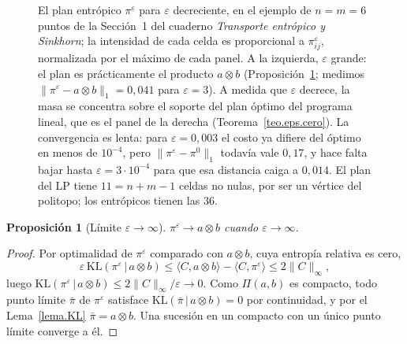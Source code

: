 \documentclass[12pt, a4paper]{amsbook}
\newcommand{\ve}{\varepsilon}
\newtheorem{prop}[teo]{Proposición}
\theoremstyle{remark}
\theoremstyle{definition}
\numberwithin{section}{chapter}
\numberwithin{subsection}{section}
\numberwithin{equation}{section}
\numberwithin{figure}{chapter}
\begin{document}
\begin{figure}[ht]
\caption{El plan entrópico $\pi^\ve$ para $\ve$ decreciente, en el ejemplo de
$n=m=6$ puntos de la Sección~1 del cuaderno \emph{Transporte entrópico y
Sinkhorn}; la intensidad de cada celda es proporcional a $\pi^\ve_{ij}$,
normalizada por el máximo de cada panel. A la izquierda, $\ve$ grande: el plan
es prácticamente el producto $a\otimes b$
(Proposición~\ref{prop.eps.infinito}; medimos
$\|\pi^\ve-a\otimes b\|_1=0{,}041$ para $\ve=3$). A medida que $\ve$ decrece,
la masa se concentra sobre el soporte del plan óptimo del programa lineal, que
es el panel de la derecha (Teorema~\ref{teo.eps.cero}). La convergencia es
lenta: para $\ve=0{,}003$ el costo ya difiere del óptimo en menos de
$10^{-4}$, pero $\|\pi^\ve-\pi^0\|_1$ todavía vale $0{,}17$, y hace falta
bajar hasta $\ve=3\cdot10^{-4}$ para que esa distancia caiga a $0{,}014$. El
plan del LP tiene $11=n+m-1$ celdas no nulas, por ser un vértice del
politopo; los entrópicos tienen las $36$.}
\label{fig.sinkhorn.eps}
\end{figure}

\begin{prop}[Límite $\varepsilon\to\infty$]\label{prop.eps.infinito}
$\pi^\varepsilon\to a\otimes b$ cuando $\varepsilon\to\infty$.
\end{prop}

\begin{proof}
Por optimalidad de $\pi^\varepsilon$ comparado con $a\otimes b$, cuya entropía
relativa es cero,
\[
\varepsilon\,\mathrm{KL}(\pi^\varepsilon\,|\,a\otimes b)
\le\langle C,a\otimes b\rangle-\langle C,\pi^\varepsilon\rangle
\le2\|C\|_\infty,
\]
luego $\mathrm{KL}(\pi^\varepsilon\,|\,a\otimes b)\le2\|C\|_\infty/\varepsilon\to0$.
Como $\Pi(a,b)$ es compacto, todo punto límite $\bar\pi$ de $\pi^\varepsilon$
satisface $\mathrm{KL}(\bar\pi\,|\,a\otimes b)=0$ por continuidad, y por el
Lema~\ref{lema.KL} $\bar\pi=a\otimes b$. Una sucesión en un compacto con un
único punto límite converge a él.
\end{proof}
\end{document}
